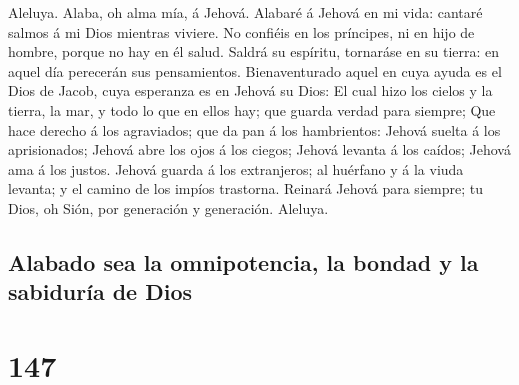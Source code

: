  Aleluya. Alaba, oh alma mía, á Jehová. 
Alabaré á Jehová en mi vida: cantaré salmos á mi Dios mientras viviere.
 No confiéis en los príncipes, ni en hijo de hombre,
porque no hay en él salud.  Saldrá su espíritu, tornaráse
en su tierra: en aquel día perecerán sus pensamientos. 
Bienaventurado aquel en cuya ayuda es el Dios de Jacob, cuya esperanza
es en Jehová su Dios:  El cual hizo los cielos y la
tierra, la mar, y todo lo que en ellos hay; que guarda verdad para
siempre;  Que hace derecho á los agraviados; que da pan á
los hambrientos: Jehová suelta á los aprisionados;  Jehová
abre los ojos á los ciegos; Jehová levanta á los caídos; Jehová ama á
los justos.  Jehová guarda á los extranjeros; al huérfano
y á la viuda levanta; y el camino de los impíos trastorna.
 Reinará Jehová para siempre; tu Dios, oh Sión, por
generación y generación. Aleluya.

\hypertarget{alabado-sea-la-omnipotencia-la-bondad-y-la-sabiduruxeda-de-dios}{%
\subsection{Alabado sea la omnipotencia, la bondad y la sabiduría de
Dios}\label{alabado-sea-la-omnipotencia-la-bondad-y-la-sabiduruxeda-de-dios}}

\hypertarget{section-146}{%
\section{147}\label{section-146}}

